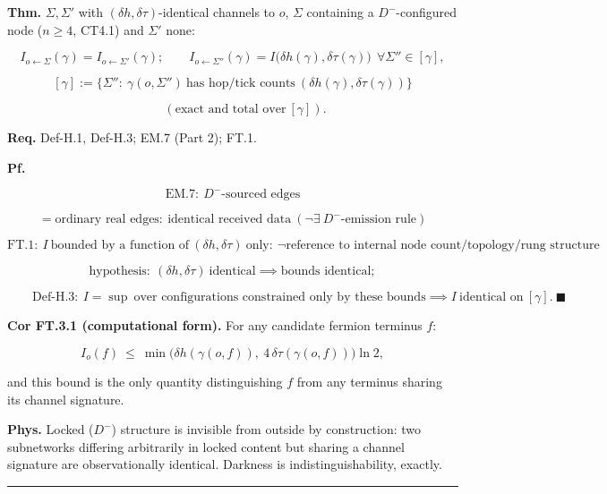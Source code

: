 \begin{theorem}\label{tag:FT-3}
\textbf{Thm.} $\Sigma,\Sigma'$ with $(\delta h,\delta\tau)$-identical channels to $o$, $\Sigma$ containing a $D^-$-configured node ($n\ge4$, CT4.1) and $\Sigma'$ none:

\[
I_{o\leftarrow\Sigma}(\gamma)=I_{o\leftarrow\Sigma'}(\gamma);\qquad
I_{o\leftarrow\Sigma''}(\gamma)=I\bigl(\delta h(\gamma),\delta\tau(\gamma)\bigr)\ \ \forall\Sigma''\in[\gamma],
\]

\[
[\gamma]:=\bigl\{\Sigma'':\ \gamma(o,\Sigma'')\ \text{has hop/tick counts}\ (\delta h(\gamma),\delta\tau(\gamma))\bigr\}
\]

\[
\qquad (\text{exact and total over}\ [\gamma]).
\]

\textbf{Req.} Def-H.1, Def-H.3; EM.7 (Part 2); FT.1.

\textbf{Pf.}

\[
\mathrm{EM.7}:\ D^-\text{-sourced edges}
\]

\[
= \text{ordinary real edges}:\ \text{identical received data}\ (\neg\exists\ D^-\text{-emission rule})
\]

\[
\mathrm{FT.1}:\ I\ \text{bounded by a function of}\ (\delta h,\delta\tau)\ \text{only}:\ \neg\text{reference to internal node count/topology/rung structure}
\]

\[
\text{hypothesis}:\ (\delta h,\delta\tau)\ \text{identical}\implies\text{bounds identical};
\]

\[
\qquad \mathrm{Def\text{-}H.3}:\ I=\sup\ \text{over configurations constrained only by these bounds}\implies I\ \text{identical on}\ [\gamma].\ \blacksquare
\]

\textbf{Cor FT.3.1 (computational form).} For any candidate fermion terminus $f$:

\[
I_o(f)\ \le\ \min\bigl(\delta h(\gamma(o,f)),\ 4\,\delta\tau(\gamma(o,f))\bigr)\ln2,
\]

and this bound is the only quantity distinguishing $f$ from any terminus sharing its channel signature.

\textbf{Phys.} Locked ($D^-$) structure is invisible from outside by construction: two subnetworks differing arbitrarily in locked content but sharing a channel signature are observationally identical. Darkness is indistinguishability, exactly.

\vspace{2pt}\noindent\rule{\textwidth}{0.4pt}\vspace{2pt}

\end{theorem}

